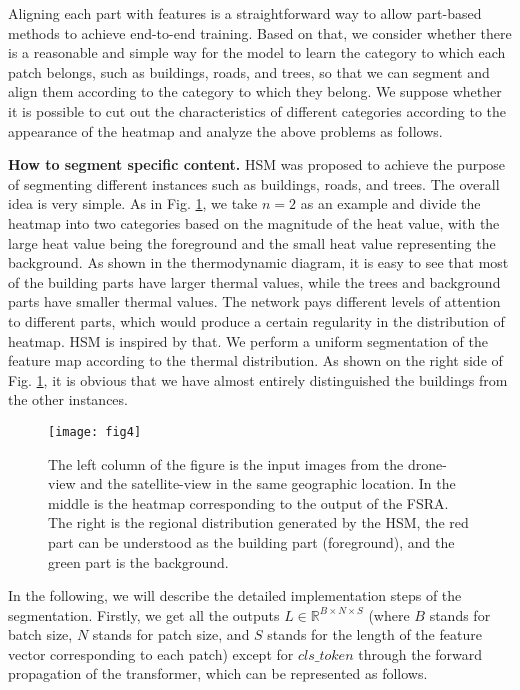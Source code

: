 \documentclass[lettersize,journal]{IEEEtran}
\begin{document}
Aligning each part with features is a straightforward way to allow part-based methods to achieve end-to-end training. Based on that, we consider whether there is a reasonable and simple way for the model to learn the category to which each patch belongs, such as buildings, roads, and trees, so that we can segment and align them according to the category to which they belong. We suppose whether it is possible to cut out the characteristics of different categories according to the appearance of the heatmap and analyze the above problems as follows.

\textbf{How to segment specific content.} HSM was proposed to achieve the purpose of segmenting different instances such as buildings, roads, and trees. The overall idea is very simple. As in Fig. \ref{fig_4}, we take $n=2$ as an example and divide the heatmap into two categories based on the magnitude of the heat value, with the large heat value being the foreground and the small heat value representing the background. As shown in the thermodynamic diagram, it is easy to see that most of the building parts have larger thermal values, while the trees and background parts have smaller thermal values. The network pays different levels of attention to different parts, which would produce a certain regularity in the distribution of heatmap. HSM is inspired by that. We perform a uniform segmentation of the feature map according to the thermal distribution. As shown on the right side of Fig. \ref{fig_4}, it is obvious that we have almost entirely distinguished the buildings from the other instances. 

\begin{figure}[!t]
\centering
\texttt{[image: fig4]}
\caption{ The left column of the figure is the input images from the drone-view and the satellite-view in the same geographic location. In the middle is the heatmap corresponding to the output of the FSRA. The right is the regional distribution generated by the HSM, the red part can be understood as the building part (foreground), and the green part is the background.}
\label{fig_4}
\end{figure}

In the following, we will describe the detailed implementation steps of the segmentation. Firstly, we get all the outputs  $L\in{\mathbb{R}^{B\times{N}\times{S}}}$ (where $B$ stands for batch size, $N$ stands for patch size, and $S$ stands for the length of the feature vector corresponding to each patch) except for $cls\_token$ through the forward propagation of the transformer, which can be represented as follows. 
\end{document}
